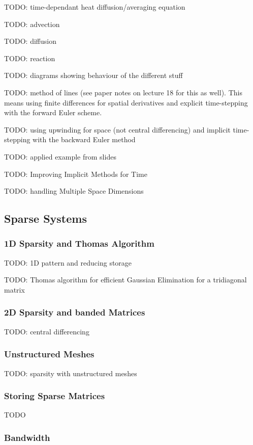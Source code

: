 \documentclass{article}
\begin{document}
TODO: time-dependant heat diffusion/averaging equation

TODO: advection

TODO: diffusion

TODO: reaction

TODO: diagrams showing behaviour of the different stuff

TODO: method of lines  (see paper notes on lecture 18 for this as well). This means using finite differences for spatial derivatives and explicit time-stepping with the forward Euler scheme.

TODO: using upwinding for space (not central differencing) and implicit time-stepping with the backward Euler method

TODO: applied example from slides

TODO: Improving Implicit Methods for Time

TODO: handling Multiple Space Dimensions

\subsection{Sparse Systems}

\subsubsection{1D Sparsity and Thomas Algorithm}

TODO: 1D pattern and reducing storage

TODO: Thomas algorithm for efficient Gaussian Elimination for a tridiagonal matrix

\subsubsection{2D Sparsity and banded Matrices}

TODO: central differencing

\subsubsection{Unstructured Meshes}

TODO: sparsity with unstructured meshes

\subsubsection{Storing Sparse Matrices}

TODO

\subsubsection{Bandwidth}
\end{document}
